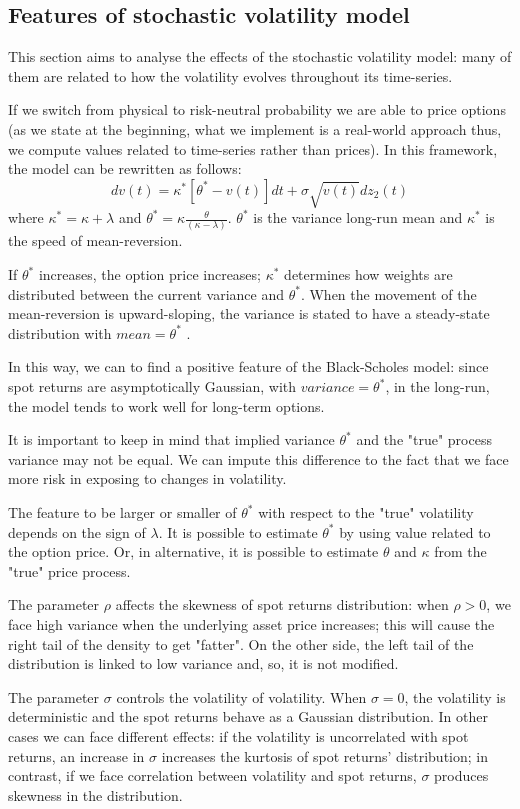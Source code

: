 \documentclass[paper=a4, fontsize=12pt]{scrartcl} %
\numberwithin{equation}{section}
\begin{document}
\subsection{Features of stochastic volatility model}
This section aims to analyse the effects of the stochastic volatility model: many of them are related to how the volatility evolves throughout its time-series. \par
If we switch from physical to risk-neutral probability we are able to price options (as we state at the beginning, what we implement is a real-world approach thus, we compute values related to time-series rather than prices). In this framework, the model can be rewritten as follows:
	\begin {equation}
		dv(t) = \kappa^*[\theta^* - v(t)] dt + \sigma \sqrt{v(t)} dz_2(t)
	\end{equation}
where $\kappa^* = \kappa + \lambda$ and $\theta^* = \kappa \frac{\theta}{(\kappa - \lambda)}$.
$\theta^*$ is the variance long-run mean and $\kappa^{*}$ is the speed of mean-reversion. \par
If $\theta^*$ increases, the option price increases; $\kappa^{*}$ determines how weights are distributed between the current variance and $\theta^*$. When the movement of the mean-reversion is upward-sloping, the variance is stated to have a steady-state distribution with $mean = \theta^*$ \cite{cir}. \par
In this way, we can to find a positive feature of the Black-Scholes model: since spot returns are asymptotically Gaussian, with $variance = \theta^*$, in the long-run, the model tends to work well for long-term options. \par
It is important to keep in mind that implied variance $\theta^*$ and the "true" process variance may not be equal. We can impute this difference to the fact that we face more risk in exposing to changes in volatility.	\par
The feature to be larger or smaller of $\theta^*$ with respect to the "true" volatility depends on the sign of $\lambda$. It is possible to estimate $\theta^*$ by using value related to the option price. Or, in alternative, it is possible to estimate $\theta$ and $\kappa$ from the "true" price process. \par
The parameter $\rho$ affects the skewness of spot returns distribution: when $\rho > 0$, we face high variance when the underlying asset price increases; this will cause the right tail of the density to get "fatter". On the other side, the left tail of the distribution is linked to low variance and, so, it is not modified.	\par
The parameter $\sigma$ controls the volatility of volatility. When $\sigma = 0$, the volatility is deterministic and the spot returns behave as a Gaussian distribution. In other cases we can face different effects: if the volatility is uncorrelated with spot returns, an increase in $\sigma$ increases the kurtosis of spot returns' distribution; in contrast, if we face correlation between volatility and spot returns, $\sigma$ produces skewness in the distribution.
\end{document}
